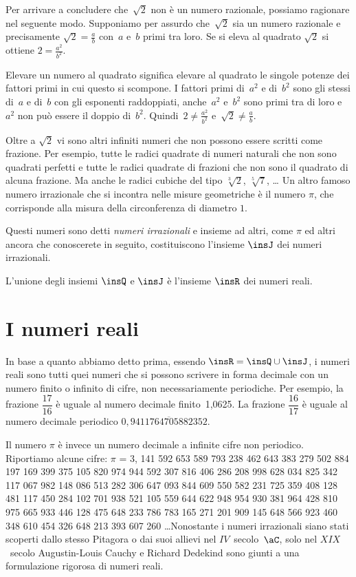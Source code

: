 Per arrivare a concludere che~$\sqrt{2}$ non è un numero razionale,
possiamo ragionare nel seguente modo. Supponiamo per assurdo che~$\sqrt{2}$
sia un numero razionale e precisamente $\sqrt{2}=\frac{a}{b}$ con~$a$ e~$b$ primi tra loro. Se si eleva al quadrato $\sqrt{2}$ si ottiene $2=\frac{a^{2}}{b^{2}}$.

Elevare un numero al quadrato significa elevare al quadrato le
singole potenze dei fattori primi in cui questo si scompone. I fattori
primi di~$a^{2}$ e di~$b^{2}$ sono gli stessi di~$a$ e di~$b$ con
gli esponenti raddoppiati, anche~$a^{2}$ e~$b^{2}$
sono primi tra di loro e~$a^{2}$ non può essere il doppio di~$b^{2}$.
Quindi~$2\ne\frac{a^{2}}{b^{2}}$ e~$\sqrt{2}\ne\frac{a}{b}$.

Oltre a $\sqrt{2}$ vi sono altri infiniti numeri che non possono essere scritti come frazione. Per esempio, tutte le radici quadrate di numeri naturali che non sono quadrati perfetti e tutte le radici quadrate di frazioni che non sono il quadrato di alcuna frazione. Ma anche le radici cubiche del tipo $\sqrt[{3}]{2}$, $\sqrt[{5}]{7}$, {\dots} Un altro famoso numero irrazionale che si incontra nelle misure geometriche è il numero $\pi$, che corrisponde alla
misura della circonferenza di diametro $1$.

Questi numeri sono detti \emph{numeri irrazionali} e insieme ad altri, come $\pi$ ed altri ancora che conoscerete in seguito, costituiscono l'insieme $\insJ$ dei numeri irrazionali.

L'unione degli insiemi $\insQ$ e $\insJ$ è l'insieme $\insR$ dei numeri reali.

\vspazio\ovalbox{\risolvii \ref{ese:1.1}, \ref{ese:1.2}}

\section{I numeri reali}
In base a quanto abbiamo detto prima, essendo $\insR=\insQ \cup \insJ$, i numeri reali sono tutti quei numeri che si possono scrivere in forma decimale con un numero finito o infinito di cifre, non necessariamente periodiche.
Per esempio, la frazione $\dfrac{17}{16}$ è uguale al numero decimale finito~1,0625.
La frazione $\dfrac{16}{17}$ è uguale al numero decimale periodico $0,\overline{9411764705882352}$.

Il numero $\pi$ è invece un numero decimale a infinite cifre non periodico. Riportiamo alcune cifre:
$\pi $ = 3, 141 592 653 589 793 238 462 643 383 279 502 884 197 169 399 375 105 820 974 944 592 307 816 406 286
208 998 628 034 825 342 117 067 982 148 086 513 282 306 647 093 844 609 550 582 231 725 359 408 128 481 117 450 284 102
701 938 521 105 559 644 622 948 954 930 381 964 428 810 975 665 933 446 128 475 648 233 786 783 165 271 201 909 145 648
566 923 460 348 610 454 326 648 213 393 607 260 \ldots Nonostante i numeri irrazionali siano stati scoperti dallo stesso Pitagora o dai suoi allievi nel $IV$~secolo~$\aC$, solo nel $XIX$~secolo Augustin-Louis Cauchy e Richard Dedekind sono giunti a una formulazione rigorosa di numeri reali.

